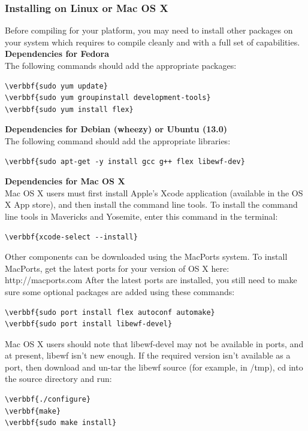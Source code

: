 \documentclass[11pt]{article} %
\begin{document}
\subsubsection{Installing on Linux or Mac OS X}
\label{InstallOnLinuxMac}
Before compiling \bulk for your platform, you may need to install other packages on your system which \bulk requires to compile cleanly and with a full set of capabilities.\\

\textbf{Dependencies for Fedora}\\
The following commands should add the appropriate packages:
\begin{Verbatim}[commandchars=\\\{\}]
\verbbf{sudo yum update}
\verbbf{sudo yum groupinstall development-tools}
\verbbf{sudo yum install flex}
\end{Verbatim}

\textbf{Dependencies for Debian (wheezy) or Ubuntu (13.0)}\\
The following command should add the appropriate libraries:
\begin{Verbatim}[commandchars=\\\{\}]
\verbbf{sudo apt-get -y install gcc g++ flex libewf-dev} 
\end{Verbatim}

\textbf{Dependencies for Mac OS X}\\
Mac OS X users must first install Apple's Xcode application (available in the OS X App store), and then install the command line tools. 
To install the command line tools in Mavericks and Yosemite, enter this command in the terminal:
\begin{Verbatim}[commandchars=\\\{\}]
\verbbf{xcode-select --install}
\end{Verbatim}

Other components can be downloaded using the MacPorts system. To install MacPorts, get the latest ports for your version of OS X here:
http://macports.com
After the latest ports are installed, you still need to make sure some optional packages are added using these commands:

\begin{Verbatim}[commandchars=\\\{\}]
\verbbf{sudo port install flex autoconf automake}
\verbbf{sudo port install libewf-devel}
\end{Verbatim}

Mac OS X users should note that libewf-devel may not be available in ports, and at present, libewf isn't new enough.  If the required version isn't available as a port, then download and un-tar the libewf source (for example, in /tmp), cd into the source directory and run:
\begin{Verbatim}[commandchars=\\\{\}]
\verbbf{./configure} 
\verbbf{make}
\verbbf{sudo make install}
\end{Verbatim}
\end{document}

